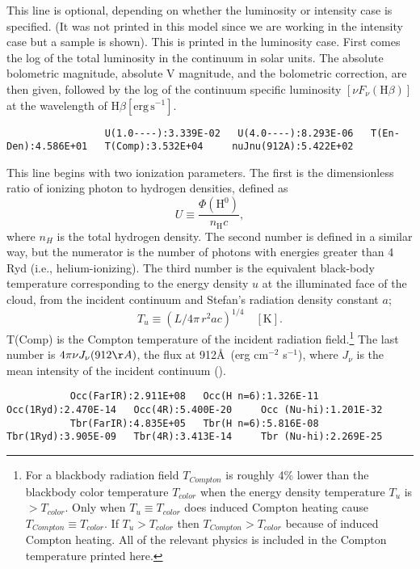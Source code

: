 This line is optional, depending on whether the luminosity or intensity
case is specified.  (It was not printed in this model since we are working
in the intensity case but a sample is shown).  This is printed in the
luminosity case.  First comes the log of the total luminosity in the
continuum in solar units.  The absolute bolometric magnitude, absolute V
magnitude, and the bolometric correction, are then given, followed by the
log of the continuum specific luminosity $[\nu F_\nu(\mathrm{H}\beta)]$
at the wavelength of H$\beta [\mathrm{erg\,s}^{-1}]$.
{\setverbatimfontsize{\tiny}
\begin{verbatim}
                 U(1.0----):3.339E-02   U(4.0----):8.293E-06   T(En-Den):4.586E+01   T(Comp):3.532E+04     nuJnu(912A):5.422E+02
\end{verbatim}
}
This line begins with two ionization parameters.
The first is the
dimensionless ratio of ionizing photon to hydrogen densities,
defined as
\begin{equation}
U \equiv \frac{{\Phi \left( {{{\mathrm{H}}^{\mathrm{0}}}}
\right)}}{{{n_{\mathrm{H}}}c}},%
\end{equation}
where $n_H$ is the total hydrogen density.
The second number is defined in
a similar way, but the numerator is the number of photons with energies
greater than 4 Ryd (i.e., helium-ionizing).
The third number is the
equivalent black-body temperature corresponding to the energy density $u$
at the illuminated face of the cloud, from the incident continuum and
Stefan's radiation density constant $a$;
\begin{equation}
{T_u} \equiv {\left( {L/4\pi \,{r^2}ac} \right)^{1/4}}\quad
 [\mathrm{K}] .%
\end{equation}
T(Comp) is the Compton temperature of the incident radiation
field.\footnote{For a blackbody radiation field $T_{Compton}$ is roughly 4\% lower than
the blackbody color temperature $T_{color}$ when the energy density temperature
$T_u$ is $> T_{color}$.
Only when $T_u \equiv T_{color}$ does induced Compton heating cause
$T_{Compton} \equiv T_{color}$.
If $T_u > T_{color}$  then $T_{Compton} >
T_{color}$ because of induced
Compton heating.
All of the relevant physics is included in the Compton
temperature printed here.}  The
last number is $4\pi \nu J_\nu(912 \AA )$, the flux at 912\AA\ (erg
cm$^{-2}$ s$^{-1}$), where
$J_\nu$ is the mean intensity of the incident continuum (\citealp{Mihalas1978}).
{\setverbatimfontsize{\tiny}
\begin{verbatim}
           Occ(FarIR):2.911E+08   Occ(H n=6):1.326E-11   Occ(1Ryd):2.470E-14   Occ(4R):5.400E-20     Occ (Nu-hi):1.201E-32
           Tbr(FarIR):4.835E+05   Tbr(H n=6):5.816E-08   Tbr(1Ryd):3.905E-09   Tbr(4R):3.413E-14     Tbr (Nu-hi):2.269E-25
\end{verbatim}
}

